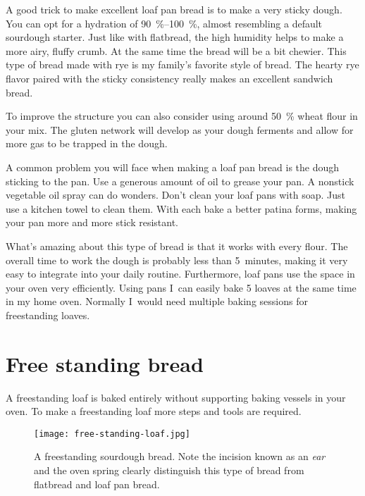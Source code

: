 A good trick to make excellent loaf pan bread is to make a very
sticky dough. You can opt for a hydration of \qtyrange{90}{100}{\percent}, almost
resembling a default sourdough starter. Just like with flatbread,
the high humidity helps to make a more airy, fluffy crumb. At
the same time the bread will be a bit chewier. This
type of bread made with rye is my family's favorite style of bread.
The hearty rye flavor paired with the sticky consistency really
makes an excellent sandwich bread.

To improve the structure you can also consider using around \qty{50}{\percent}
wheat flour in your mix. The gluten network will develop as your
dough ferments and allow for more gas to be trapped in the dough.

A common problem you will face when making a loaf pan bread is
the dough sticking to the pan. Use a generous amount of oil to grease
your pan. A nonstick vegetable oil spray can do wonders.
Don't clean your loaf pans with soap. Just use a kitchen towel
to clean them. With each bake a better patina forms, making your
pan more and more stick resistant.

What's amazing about this type of bread is that it works
with every flour. The overall time to work the dough is probably
less than 5~minutes, making it very easy to integrate
into your daily routine. Furthermore, loaf pans use the space
in your oven very efficiently. Using pans I~can
easily bake 5 loaves at the same time in my home oven.
Normally I~would need multiple baking sessions for
freestanding loaves.

\section{Free standing bread}

A freestanding loaf is baked entirely without supporting
baking vessels in your oven. To make a freestanding loaf more steps
and tools are required.

\begin{figure}[!htb]
\begin{center}
  \texttt{[image: free-standing-loaf.jpg]}
  \caption[Freestanding sourdough bread]{A freestanding sourdough bread. Note
      the incision known as an \emph{ear} and the oven spring clearly
      distinguish this type of bread from flatbread and loaf pan bread.}
\end{center}
\end{figure}

